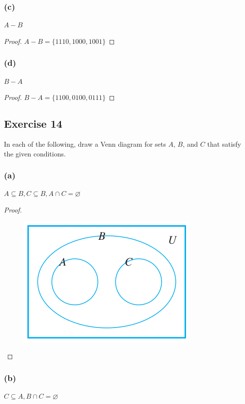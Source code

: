 \documentclass[14pt]{extarticle}
\newcommand{\es}{\varnothing}
\begin{document}
\subsubsection{(c)}
$A - B$

\begin{proof}
\(A - B = \{1110, 1000, 1001\}\)
\end{proof}

\subsubsection{(d)}
$B - A$

\begin{proof}
\(B - A = \{1100, 0100, 0111\}\)
\end{proof}

\subsection{Exercise 14}
In each of the following, draw a Venn diagram for sets $A$, $B$, and $C$ that satisfy the given conditions.

\subsubsection{(a)}
\(A \subseteq B, C \subseteq B, A \cap C = \es\)

\begin{proof}
\begin{figure}[ht!]
\centering
\includegraphics[scale=0.5]{../images/6.1.14.a.png}
\end{figure}
\end{proof}

\subsubsection{(b)}
\(C \subseteq A, B \cap C = \es\)
\end{document}

